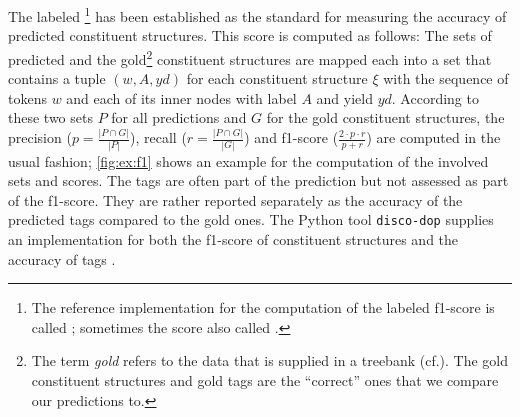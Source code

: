 \documentclass[../document.tex]{subfiles}
\begin{document}
    The labeled \footnote{
        The reference implementation for the computation of the labeled f1-score is called  \citep{Black91}; sometimes the score also called .
    } \citep{Black91,Col97} has been established as the standard for measuring the accuracy of predicted constituent structures.
    This score is computed as follows:
    The sets of predicted and the gold\footnote{
        The term \emph{gold} refers to the data that is supplied in a treebank (cf.\@ \pageref{pg:def:gold}).
        The gold constituent structures and gold  tags are the ``correct'' ones  that we compare our predictions to.
    } constituent structures are mapped each into a set that contains a tuple \((w, A, \mathit{yd})\) for each constituent structure \(\xi\) with the sequence of tokens \(w\) and each of its inner nodes with label \(A\) and yield \(\mathit{yd}\).
    According to these two sets \(P\) for all predictions and \(G\) for the gold constituent structures, the precision (\(p = \frac{|P \cap G|}{|P|}\)), recall (\(r = \frac{|P \cap G|}{|G|}\)) and f1-score (\(\frac{2\cdot p\cdot r}{p + r}\)) are computed in the usual fashion; \cref{fig:ex:f1} shows an example for the computation of the involved sets and scores.
    The  tags are often part of the prediction but not assessed as part of the f1-score.
    They are rather reported separately as the accuracy of the predicted  tags compared to the gold ones.
    The Python tool \texttt{disco-dop} supplies an implementation for both the f1-score of constituent structures and the accuracy of  tags \citep{CraSchBod16}.
\end{document}
